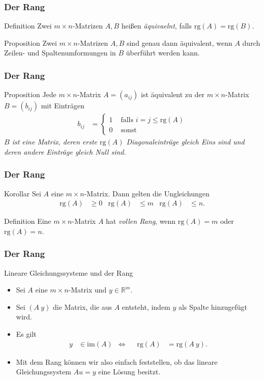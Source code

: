 \documentclass{beamer}
\renewcommand{\emph}[1]{{\textcolor{solarizedRed}{\itshape #1}}}
\newcommand\RR{\mathbb R}
\renewcommand{\ae}{\"a}
\renewcommand{\oe}{\"o}
\newcommand{\ue}{\"u}
\newcommand{\im}{\mathrm{im}}
\newcommand{\rk}{\mathrm{rg}}
\newcommand{\mytitle}{Der Rang}
\begin{document}
\begin{frame}\frametitle{\mytitle}
	\begin{block}{Definition}
		Zwei $m\times n$-Matrizen $A,B$ hei\ss en \emph{\ae quivaelnt}, falls $\rk(A)=\rk(B)$.
	\end{block}
\begin{block}{Proposition}
		Zwei $m\times n$-Matrizen $A,B$ sind genau dann \ae quivalent, wenn $A$ durch Zeilen- und Spaltenumformungen in $B$ \ue berf\ue hrt werden kann.
	\end{block}
\end{frame}

\begin{frame}\frametitle{\mytitle}
\begin{block}{Proposition}
	Jede $m\times n$-Matrix $A=(a_{ij})$ ist \ae quivalent zu der $m\times n$-Matrix $B=(b_{ij})$ mit Eintr\ae gen
	\begin{align*}
		b_{ij}&=\begin{cases}
			1&\mbox{ falls }i=j\leq\rk(A)\\
			0&\mbox{ sonst}
		\end{cases}
	\end{align*}
	\emph{$B$ ist eine Matrix, deren erste $\rk(A)$ Diagonaleintr\ae ge gleich Eins sind und deren andere Eintr\ae ge gleich Null sind.}
	\end{block}
\end{frame}

\begin{frame}\frametitle{\mytitle}
\begin{block}{Korollar}
	Sei $A$ eine $m\times n$-Matrix.
	Dann gelten die Ungleichungen
	\begin{align*}
		\rk(A)&\geq 0&\rk(A)&\leq m&\rk(A)&\leq n. 
	\end{align*}
	\end{block}
	\begin{block}{Definition}
		Eine $m\times n$-Matrix $A$ hat \emph{vollen Rang}, wenn $\rk(A)=m$ oder $\rk(A)=n$.
	\end{block}
\end{frame}

\begin{frame}\frametitle{\mytitle}
\begin{block}{Lineare Gleichungssysteme und der Rang}
\begin{itemize}
	\item Sei $A$ eine $m\times n$-Matrix und $y\in\RR^m$.
	\item Sei $(A\ y)$ die Matrix, die aus $A$ entsteht, indem $y$ als Spalte hinzugef\ue gt wird.
	\item Es gilt
		\begin{align*}
			y&\in\im(A)&\Leftrightarrow&&\rk(A)&=\rk(A\ y).
		\end{align*}
	\item Mit dem Rang k\oe nnen wir also einfach feststellen, ob das lineare Gleichungssystem $ Au=y $ eine L\oe sung besitzt.
\end{itemize}
	\end{block}
\end{frame}
\end{document}
